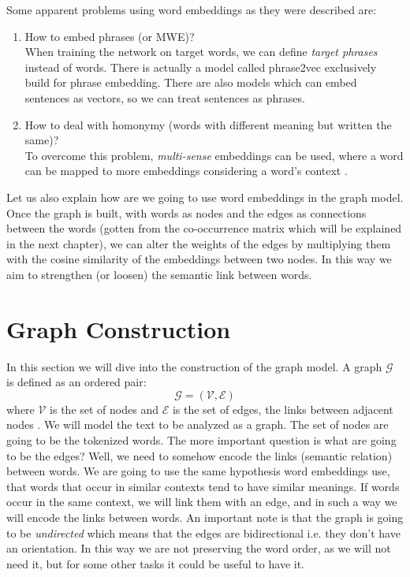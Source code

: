 \documentclass[12pt]{article}
\numberwithin{equation}{section}
\begin{document}
\begin{spacing}{1.5}
	Some apparent problems using word embeddings as they were described are:
	\begin{enumerate}
		\item How to embed phrases (or MWE)?\\
		When training the network on target words, we can define \textit{target phrases} instead of words. There is actually a model called phrase2vec exclusively build for phrase embedding. There are also models which can embed sentences as vectors, so we can treat sentences as phrases.
		\item How to deal with homonymy (words with different meaning but written the same)? \\
		To overcome this problem, \textit{multi-sense} embeddings can be used, where a word can be mapped to more embeddings considering a word's context \cite{multi_sense_we}. 
	\end{enumerate}
	
	Let us also explain how are we going to use word embeddings in the graph model. Once the graph is built, with words as nodes and the edges as connections between the words (gotten from the co-occurrence matrix which will be explained in the next chapter), we can alter the weights of the edges by multiplying them with the cosine similarity of the embeddings between two nodes. In this way we aim to strengthen (or loosen) the semantic link between words.
	
	
	\newpage
	\section{Graph Construction}
	In this section we will dive into the construction of the graph model. A graph $\mathcal{G}$ is defined as an ordered pair:
	\begin{equation}
		\mathcal{G} = (\mathcal{V},\mathcal{E})
	\end{equation}
	where $\mathcal{V}$ is the set of nodes and $\mathcal{E}$ is the set of edges, the links between adjacent nodes \cite{juricGrafovi}. We will model the text to be analyzed as a graph. The set of nodes are going to be the tokenized words. The more important question is what are going to be the edges?
	Well, we need to somehow encode the links (semantic relation) between words. We are going to use the same hypothesis word embeddings use, that words that occur in similar contexts tend to have similar meanings. If words occur in the same context, we will link them with an edge, and in such a way we will encode the links between words. An important note is that the graph is going to be \textit{undirected} which means that the edges are bidirectional i.e. they don't have an orientation. In this way we are not preserving the word order, as we will not need it, but for some other tasks it could be useful to have it.
	

\end{spacing}
\end{document}

